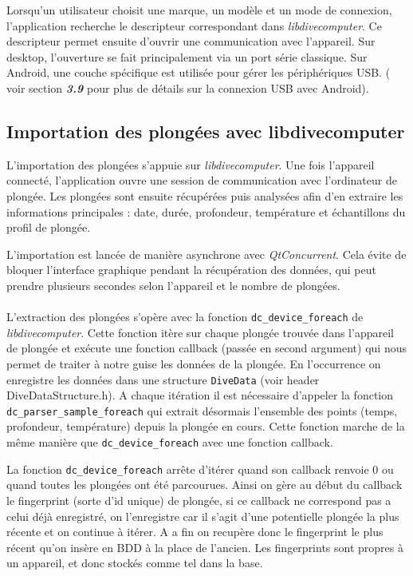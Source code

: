 \documentclass{article}
\begin{document}
Lorsqu'un utilisateur choisit une marque, un modèle et un mode de connexion,
l'application recherche le descripteur correspondant dans \textit{libdivecomputer}.
Ce descripteur permet ensuite d'ouvrir une communication avec l'appareil. Sur
desktop, l'ouverture se fait principalement via un port série classique. Sur
Android, une couche spécifique est utilisée pour gérer les périphériques USB. ( voir section \textbf{\textit{3.9}} pour plus de détails sur la connexion USB avec Android).

\subsection{Importation des plongées avec libdivecomputer}
L'importation des plongées s'appuie sur \textit{libdivecomputer}. Une fois
l'appareil connecté, l'application ouvre une session de communication avec
l'ordinateur de plongée. Les plongées sont ensuite récupérées puis analysées afin
d'en extraire les informations principales : date, durée, profondeur, température
et échantillons du profil de plongée.

L'importation est lancée de manière asynchrone avec \textit{QtConcurrent}. Cela
évite de bloquer l'interface graphique pendant la récupération des données, qui
peut prendre plusieurs secondes selon l'appareil et le nombre de plongées.

\paragraph{}
L'extraction des plongées s'opère avec la fonction \texttt{dc\_device\_foreach} de \textit{libdivecomputer}. Cette fonction itère sur chaque plongée trouvée dans l'appareil de plongée et exécute une fonction callback (passée en second argument) qui nous permet de traiter à notre guise les données de la plongée. En l’occurrence on enregistre les données dans une structure \texttt{DiveData} (voir header DiveDataStructure.h). A chaque itération il est nécessaire d'appeler la fonction \texttt{dc\_parser\_sample\_foreach} qui extrait désormais l'ensemble des points (temps, profondeur, température) depuis la plongée en cours. Cette fonction marche de la même manière que \texttt{dc\_device\_foreach} avec une fonction callback.

La fonction \texttt{dc\_device\_foreach} arrête d'itérer quand son callback renvoie 0 ou quand toutes les plongées ont été parcourues. Ainsi on gère au début du callback le fingerprint (sorte d'id unique) de plongée, si ce callback ne correspond pas a celui déjà enregistré, on l'enregistre car il s'agit d'une potentielle plongée la plus récente et on continue à itérer. A a fin on recupère donc le fingerprint le plus récent qu'on insère en BDD à la place de l'ancien. Les fingerprints sont propres à un appareil, et donc stockés comme tel dans la base.
\end{document}
